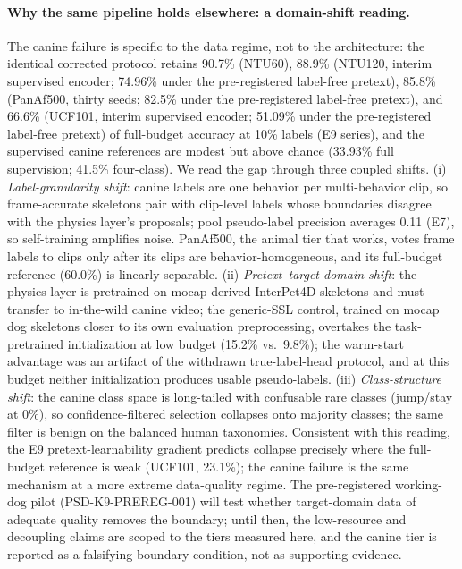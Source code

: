 \paragraph{Why the same pipeline holds elsewhere: a domain-shift reading.}
The canine failure is specific to the data regime, not to the architecture: the identical corrected protocol retains 90.7\% (NTU60), 88.9\% (NTU120, interim supervised encoder; 74.96\% under the pre-registered label-free pretext), 85.8\% (PanAf500, thirty seeds; 82.5\% under the pre-registered label-free pretext), and 66.6\% (UCF101, interim supervised encoder; 51.09\% under the pre-registered label-free pretext) of full-budget accuracy at 10\% labels (E9 series), and the supervised canine references are modest but above chance (33.93\% full supervision; 41.5\% four-class). We read the gap through three coupled shifts. (i) \emph{Label-granularity shift}: canine labels are one behavior per multi-behavior clip, so frame-accurate skeletons pair with clip-level labels whose boundaries disagree with the physics layer's proposals; pool pseudo-label precision averages 0.11 (E7), so self-training amplifies noise. PanAf500, the animal tier that works, votes frame labels to clips only after its clips are behavior-homogeneous, and its full-budget reference (60.0\%) is linearly separable. (ii) \emph{Pretext--target domain shift}: the physics layer is pretrained on mocap-derived InterPet4D skeletons and must transfer to in-the-wild canine video; the generic-SSL control, trained on mocap dog skeletons closer to its own evaluation preprocessing, overtakes the task-pretrained initialization at low budget (15.2\% vs.\ 9.8\%); the warm-start advantage was an artifact of the withdrawn true-label-head protocol, and at this budget neither initialization produces usable pseudo-labels. (iii) \emph{Class-structure shift}: the canine class space is long-tailed with confusable rare classes (jump/stay at 0\%), so confidence-filtered selection collapses onto majority classes; the same filter is benign on the balanced human taxonomies. Consistent with this reading, the E9 pretext-learnability gradient predicts collapse precisely where the full-budget reference is weak (UCF101, 23.1\%); the canine failure is the same mechanism at a more extreme data-quality regime. The pre-registered working-dog pilot (PSD-K9-PREREG-001) will test whether target-domain data of adequate quality removes the boundary; until then, the low-resource and decoupling claims are scoped to the tiers measured here, and the canine tier is reported as a falsifying boundary condition, not as supporting evidence.

